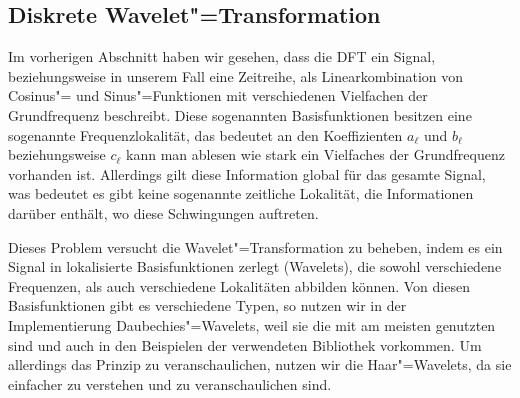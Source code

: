 \subsection{Diskrete Wavelet"=Transformation}
Im vorherigen Abschnitt haben wir gesehen, dass die \acs{DFT} ein Signal, beziehungsweise in unserem Fall eine Zeitreihe, als Linearkombination von Cosinus"= und Sinus"=Funktionen mit verschiedenen Vielfachen der Grundfrequenz beschreibt. Diese sogenannten Basisfunktionen besitzen eine sogenannte Frequenzlokalität, das bedeutet an den Koeffizienten $a_\ell$ und $b_\ell$ beziehungsweise $c_\ell$ kann man ablesen wie stark ein Vielfaches der Grundfrequenz vorhanden ist. Allerdings gilt diese Information global für das gesamte Signal, was bedeutet es gibt keine sogenannte zeitliche Lokalität, die Informationen darüber enthält, wo diese Schwingungen auftreten.

Dieses Problem versucht die Wavelet"=Transformation zu beheben, indem es ein Signal in lokalisierte Basisfunktionen zerlegt (Wavelets), die sowohl verschiedene Frequenzen, als auch verschiedene Lokalitäten abbilden können. Von diesen Basisfunktionen gibt es verschiedene Typen, so nutzen wir in der Implementierung Daubechies"=Wavelets, weil sie die mit am meisten genutzten sind und auch in den Beispielen der verwendeten Bibliothek vorkommen. Um allerdings das Prinzip zu veranschaulichen, nutzen wir die Haar"=Wavelets, da sie einfacher zu verstehen und zu veranschaulichen sind.


